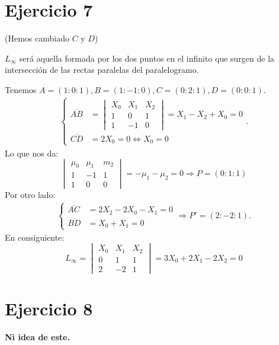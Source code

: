 \documentclass[10pt,a4paper,openright]{book}
\theoremstyle{break}
\begin{document}
\section{Ejercicio 7}%
\label{sec:ejercicio_7}
(Hemos cambiado $C$ y $D$)

$L_{\infty}$ será aquella formada por los dos puntos en el infinito que surgen de la intersección de las rectas paralelas del paralelogramo.

Tenemos $A = \left( 1 : 0 : 1 \right), B = \left( 1 : -1 : 0 \right), C = \left( 0 : 2 : 1 \right), D = \left( 0 : 0 : 1 \right)$.
\begin{align*}
    \begin{cases}
        \overline{AB} &= \begin{vmatrix} X_0 & X_1 & X_2\\ 1 & 0 & 1\\ 1 & -1 & 0 \end{vmatrix} = X_1 - X_2 + X_0 = 0\\    
        \overline{CD} &= 2X_0 = 0 \Leftrightarrow X_0 = 0
    \end{cases} 
.\end{align*} 
Lo que nos da:
\[
    \begin{vmatrix} \mu_0 & \mu_1 & m_2\\ 1 & -1 & 1\\ 1 & 0 & 0 \end{vmatrix} = -\mu_1 - \mu_2 = 0 \Rightarrow P = \left( 0 : 1 : 1 \right) 
\]
Por otro lado:
\begin{align*}
    \begin{cases}
        \overline{AC} &= 2X_2 - 2X_0 - X_1 = 0\\
        \overline{BD} &= X_0 + X_1 = 0
    \end{cases} \Rightarrow
    P' = \left( 2 : -2 : 1 \right) 
.\end{align*}
En consiguiente: 
\[
    L_{\infty} = \begin{vmatrix} X_0 & X_1 & X_2\\ 0 & 1 & 1\\ 2 & -2 & 1 \end{vmatrix} = 3X_0 + 2X_1 - 2X_2 = 0
\]

\section{Ejercicio 8}%
\label{sec:ejercicio_8}
\textbf{Ni idea de este.} 
\end{document}
